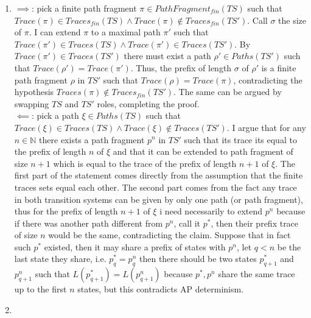 \documentclass{article}
\begin{document}
	\begin{enumerate}[label=\alph*)]
		\item $\implies$: pick a finite path fragment $\pi \in PathFragment_{fin}(TS)$ such that $Trace(\pi) \in Traces_{fin}(TS) \land Trace(\pi) \notin Traces_{fin}(TS')$. Call $\sigma$ the size of $\pi$. I can extend $\pi$ to a maximal path $\pi'$ such that $Trace(\pi') \in Traces(TS) \land Trace(\pi') \in Traces(TS')$. By $Trace(\pi') \in Traces(TS')$ there must exist a path $\rho' \in Paths(TS')$ such that $Trace(\rho') = Trace(\pi')$. Thus, the prefix of length $\sigma$ of $\rho'$ is a finite path fragment $\rho$ in $TS'$ such that $Trace(\rho)=Trace(\pi)$, contradicting the hypothesis $Traces(\pi) \notin Traces_{fin}(TS')$. The same can be argued by swapping $TS$ and $TS'$ roles, completing the proof.\\
		$\impliedby$: pick a path $\xi \in Paths(TS)$ such that $Trace(\xi) \in Traces(TS) \land Trace(\xi) \notin Traces(TS')$. I argue that for any $n \in \mathbb{N}$ there exists a path fragment $p^n$ in $TS'$ such that its trace its equal to the prefix of length $n$ of $\xi$ and that it can be extended to path fragment of size $n+1$ which is equal to the trace of the prefix of length $n+1$ of $\xi$. 
		The first part of the statement comes directly from the assumption that the finite traces sets equal each other. The second part comes from the fact any trace in both transition systems can be given by only one path (or path fragment), thus for the prefix of length $n+1$ of $\xi$ i need necessarily to extend $p^n$ because if there was another path different from $p^n$, call it $p^*$, then their prefix trace of size $n$ would be the same, contradicting the claim.
		Suppose that in fact such $p^*$ existed, then it may share a prefix of states with $p^n$, let $q < n$ be the last state they share, i.e. $p^*_q = p^n_q$ then there should be two states $p^*_{q+1}$ and $p^n_{q+1}$ such that $L(p^*_{q+1})=L(p^n_{q+1})$ because $p^*, p^n$ share the same trace up to the first $n$ states, but this contradicts AP determinism.
		\item 
	\end{enumerate}
\end{document}
